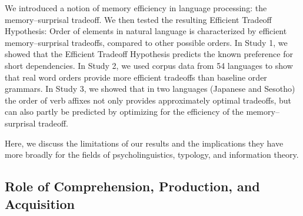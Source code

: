 We introduced a notion of memory efficiency in language processing: the memory--surprisal tradeoff.
We then tested the resulting Efficient Tradeoff Hypothesis: Order of elements in natural language is characterized by efficient memory--surprisal tradeoffs, compared to other possible orders.
In Study 1, we showed that the Efficient Tradeoff Hypothesis predicts the known preference for short dependencies.
In Study 2, we used corpus data from 54 languages to show that real word orders provide more efficient tradeoffs than baseline order grammars.
In Study 3, we showed that in two languages (Japanese and Sesotho) the order of verb affixes not only provides approximately optimal tradeoffs, but can also partly be predicted by optimizing for the efficiency of the memory--surprisal tradeoff.

Here, we discuss the limitations  of our results and the implications they have more broadly for the fields of psycholinguistics, typology, and information theory.






\subsection{Role of Comprehension, Production, and Acquisition}





